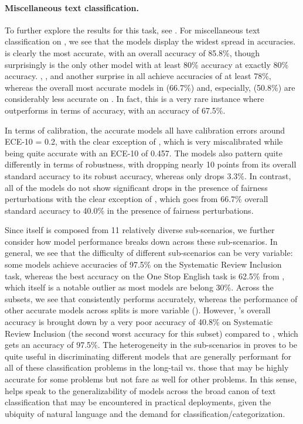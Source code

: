 \paragraph{Miscellaneous text classification.}
To further explore the results for this task, see .
For miscellaneous text classification on \raft, we see that the models display the widest spread in accuracies.
\glm is clearly the most accurate, with an overall accuracy of 85.8\%, though surprisingly \jurassicgrande is the only other model with at least 80\% accuracy at exactly 80\% accuracy.
\jurassicjumbo, \coherexl, and another surprise in \gptj all achieve accuracies of at least 78\%, whereas the overall most accurate models in \instructdavinci (66.7\%) and, especially, \anthropic (50.8\%) are considerably less accurate on \raft. 
In fact, this is a very rare instance where \gptdavinci outperforms \instructdavinci in terms of accuracy, with an accuracy of 67.5\%. 

In terms of calibration, the accurate models all have calibration errors around ECE-10 = 0.2, with the clear exception of \gptj, which is very miscalibrated while being quite accurate with an ECE-10 of 0.457. 
The models also pattern quite differently in terms of robustness, with \jurassicgrande dropping nearly 10 points from its overall standard accuracy to its robust accuracy, whereas \glm only drops 3.3\%. 
In contrast, all of the models do not show significant drops in the presence of fairness perturbations with the clear exception of \instructdavinci, which goes from 66.7\% overall standard accuracy to 40.0\% in the presence of fairness perturbations. 

Since \raft itself is composed from 11 relatively diverse sub-scenarios, we further consider how model performance breaks down across these sub-scenarios. 
In general, we see that the difficulty of different sub-scenarios can be very variable: some models achieve accuracies of 97.5\% on the Systematic Review Inclusion task, whereas the best accuracy on the One Stop English task is 62.5\% from \gptj, which itself is a notable outlier as most models are belong 30\%.  
Across the subsets, we see that \instructdavinci consistently performs accurately, whereas the performance of other accurate models across splits is more variable (\eg \glm).
However, \instructdavinci's overall accuracy is brought down by a very poor accuracy of 40.8\% on Systematic Review Inclusion (the second worst accuracy for this subset) compared to \glm, which gets an accuracy of 97.5\%.
The heterogeneity in the sub-scenarios in \raft proves to be quite useful in discriminating different models that are generally performant for all of these classification problems in the long-tail vs. those that may be highly accurate for some problems but not fare as well for other problems.
In this sense, \raft helps speak to the generalizability of models across the broad canon of text classification that may be encountered in practical deployments, given the ubiquity of natural language and the demand for classification/categorization. 
